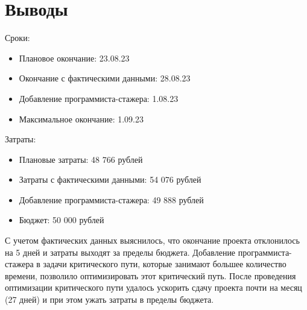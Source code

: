\chapter{Выводы}

Сроки:

\begin{itemize}
	\item Плановое окончание: 23.08.23
	\item Окончание с фактическими данными: 28.08.23
	\item Добавление программиста-стажера: 1.08.23
	\item Максимальное окончание: 1.09.23
\end{itemize}

Затраты:

\begin{itemize}
	\item Плановые затраты: 48 766 рублей
	\item Затраты с фактическими данными: 54 076 рублей
	\item Добавление программиста-стажера: 49 888 рублей
	\item Бюджет: 50 000 рублей
\end{itemize}

С учетом фактических данных выяснилось, что окончание проекта отклонилось на 5 дней и затраты выходят за пределы бюджета. Добавление программиста-стажера в задачи критического пути, которые занимают большее количество времени, позволило оптимизировать этот критический путь. После проведения оптимизации критического пути удалось ускорить сдачу проекта почти на месяц (27 дней) и при этом ужать затраты в пределы бюджета.